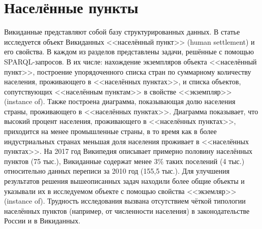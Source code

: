 \chapter{Населённые пункты}
\label{ch:human-settlement}

	Викиданные представляют собой базу структурированных данных. В статье исследуется объект Викиданных <<населённый пункт>> (human settlement) и его свойства. 
В каждом из разделов представлены задачи, решённые с помощью SPARQL-запросов. В их числе: нахождение экземпляров объекта <<населённый пункт>>, построение
упорядоченного списка стран по суммарному количеству населения, проживающего в <<населённых пунктах>>, и списка объектов, сопутствующих <<населённым 
пунктам>> в свойстве <<экземпляр>> (instance of). Также построена диаграмма, показывающая долю населения страны, проживающего в <<населённых пунктах>>. 
Диаграмма показывает, что высокий процент населения, проживающего в <<населённых пунктах>>, приходится на менее промышленные страны, в то время как в более 
индустриальных странах меньшая доля населения проживает в <<населённых пунктах>>. На 2017 год Википедия описывает примерно половину населённых пунктов 
(75 тыс.), Викиданные содержат менее 3\% таких поселений (4 тыс.) относительно данных переписи за 2010 год (155,5 тыс.). Для улучшения результатов решения 
вышеописанных задач находили более общие объекты и указывали их в исследуемом объекте с помощью свойства <<экземляр>> (instance of). Трудность исследования 
вызвана отсутствием чёткой типологии населённых пунктов (например, от численности населения) в законодательстве России и в Викиданных.
